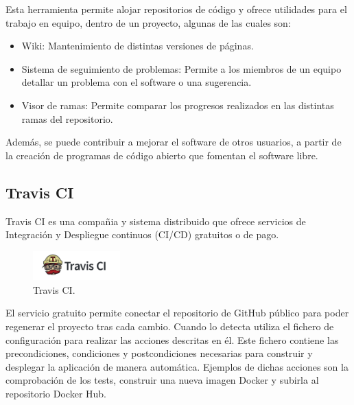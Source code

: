 
Esta herramienta permite alojar repositorios de código y ofrece utilidades para el trabajo en equipo, dentro de un proyecto, algunas de las cuales son:
\begin{itemize}
\item Wiki: Mantenimiento de distintas versiones de páginas.
\item Sistema de seguimiento de problemas: Permite a los miembros de un equipo detallar un problema con el software o una sugerencia.
\item Visor de ramas: Permite comparar los progresos realizados en las distintas ramas del repositorio.
\end{itemize}

Además, se puede contribuir a mejorar el software de otros usuarios, a partir de la creación de programas de código abierto que fomentan el software libre.

\subsection{Travis CI}

Travis CI\cite{travisci} es una compañia y sistema distribuido que ofrece servicios de Integración y Despliegue continuos (CI/CD) gratuitos o de pago.

\begin{figure}[H]
\centering
\includegraphics[width=0.3\textwidth]{images/figures/travisci.jpg}
\caption{Travis CI.\footnotemark}
\end{figure}


El servicio gratuito permite conectar el repositorio de GitHub público para poder regenerar el proyecto tras cada cambio. Cuando lo detecta utiliza el fichero de configuración  para realizar las acciones descritas en él. Este fichero contiene las precondiciones, condiciones y postcondiciones necesarias para construir y desplegar la aplicación de manera automática. Ejemplos de dichas acciones son la comprobación de los tests, construir una nueva imagen Docker y subirla al repositorio Docker Hub.

